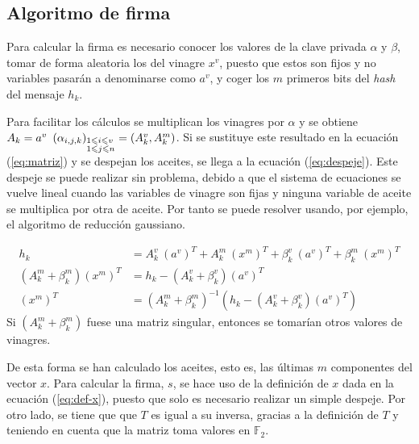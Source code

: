 \subsection{Algoritmo de firma}

Para calcular la firma es necesario conocer los valores de la clave privada $\alpha$ y $\beta$, tomar de forma aleatoria los del vinagre $x^v$, puesto que estos son fijos y no variables pasarán a denominarse como $a^v$, y coger los $m$ primeros bits del \textit{hash} del mensaje $h_k$.

Para facilitar los cálculos se multiplican los vinagres por $\alpha$ y se obtiene \mbox{$A_k = a^v\ \left(\alpha_{i,j,k}\right)_{\begin{subarray}{l}{1 \leqslant i\leqslant v }\\ {1\leqslant j \leqslant n}\end{subarray}} = \left(A^v_k, A^m_k\right)$}. Si se sustituye este resultado en la ecuación (\ref{eq:matriz}) y se despejan los aceites, se llega a la ecuación (\ref{eq:despeje}). Este despeje se puede realizar sin problema, debido a que el sistema de ecuaciones se vuelve lineal cuando las variables de vinagre son fijas y ninguna variable de aceite se multiplica por otra de aceite. Por tanto se puede resolver usando, por ejemplo, el algoritmo de reducción gaussiano.

\begin{align}
h_k &= A_k^v\ (a^v)^{\scriptscriptstyle T} +  A_k^m\ (x^m)^{\scriptscriptstyle T} + \beta_k^v\ (a^v)^{\scriptscriptstyle T} + \beta_k^m\ (x^m)^{\scriptscriptstyle T}\\
\label{eq:ter-coef}
(A_k^m + \beta_k^m) (x^m)^{\scriptscriptstyle T} &= h_k - (A_k^v + \beta_k^v) (a^v)^{\scriptscriptstyle T}\\
\label{eq:despeje}
(x^m)^{\scriptscriptstyle T} &= (A_k^m + \beta_k^m)^{-1} (h_k - (A_k^v + \beta_k^v) (a^v)^{\scriptscriptstyle T})
\end{align}
Si $(A_k^m + \beta_k^m)$ fuese una matriz singular, entonces se tomarían otros valores de vinagres.

De esta forma se han calculado los aceites, esto es, las últimas $m$ componentes del vector $x$. Para calcular la firma, $s$, se hace uso de la definición de $x$  dada en la ecuación (\ref{eq:def-x}), puesto que solo es necesario realizar un simple despeje. Por otro lado, se tiene que  que $T$ es igual a su inversa, gracias a la definición de $T$ y teniendo en cuenta que la matriz toma valores en $\mathds{F}_2$.

